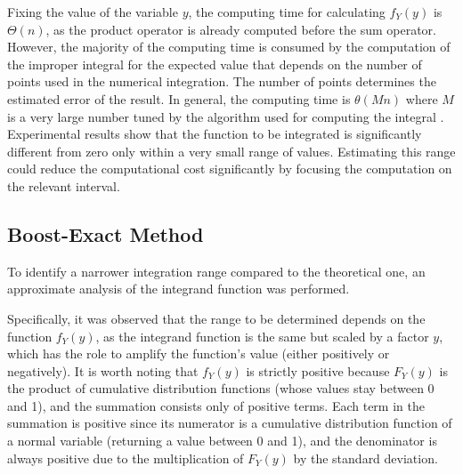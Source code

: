 Fixing the value of the variable $y$, the computing time for calculating $f_Y(y)$ is $\Theta(n)$, as the product operator is already computed before the sum operator. However, the majority of the computing time is consumed by the computation of the improper integral for the expected value that depends on the number of points used in the numerical integration. The number of points determines the estimated error of the result. In general, the computing time is $\theta(M n)$ where $M$ is a very large number tuned by the algorithm used for computing the integral \cite{2020SciPy-NMeth}.
Experimental results show that the function to be integrated is significantly different from zero only within a very small range of values. Estimating this range could reduce the computational cost significantly by focusing the computation on the relevant interval.

\subsection{Boost-Exact Method}
To identify a narrower integration range compared to the theoretical one, an approximate analysis of the integrand function was performed.

Specifically, it was observed that the range to be determined depends on the function \( f_Y(y) \), as the integrand function is the same but scaled by a factor \( y \), which has the role to amplify the function's value (either positively or negatively). It is worth noting that \( f_Y(y) \) is strictly positive because \( F_Y(y) \) is the product of cumulative distribution functions (whose values stay between 0 and 1), and the summation consists only of positive terms. Each term in the summation is positive since its numerator is a cumulative distribution function of a normal variable (returning a value between 0 and 1), and the denominator is always positive due to the multiplication of \( F_Y(y) \) by the standard deviation.

